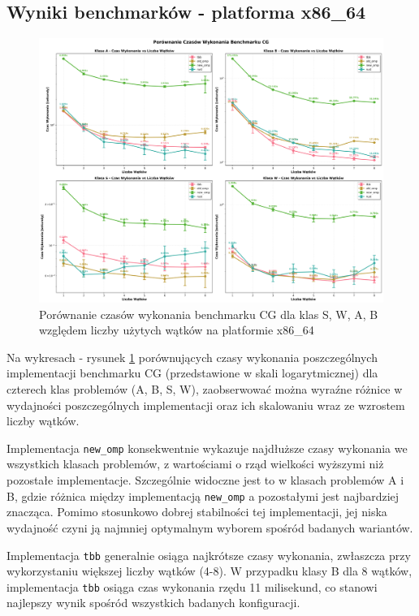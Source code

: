 \subsection{Wyniki benchmarków - platforma x86\_64}
\begin{figure}[H]
    \centering
    \includegraphics[width=\textwidth]{analiza/images/parallel/cg/x86/cg_porownanie_czasow_wykonania.png}
    \caption{Porównanie czasów wykonania benchmarku CG dla klas S, W, A, B względem liczby użytych wątków na platformie x86\_64}
    \label{cg_porownanie_czasow_wykonania_x86_64}
\end{figure}
Na wykresach - rysunek \ref{cg_porownanie_czasow_wykonania_x86_64} porównujących czasy wykonania poszczególnych implementacji benchmarku CG (przedstawione w skali logarytmicznej) dla czterech klas problemów (A, B, S, W), zaobserwować można wyraźne różnice w wydajności poszczególnych implementacji oraz ich skalowaniu wraz ze wzrostem liczby wątków.

Implementacja \texttt{new\_omp} konsekwentnie wykazuje najdłuższe czasy wykonania we wszystkich klasach problemów, z wartościami o rząd wielkości wyższymi niż pozostałe implementacje. Szczególnie widoczne jest to w klasach problemów A i B, gdzie różnica między implementacją \texttt{new\_omp} a pozostałymi jest najbardziej znacząca. Pomimo stosunkowo dobrej stabilności tej implementacji, jej niska wydajność czyni ją najmniej optymalnym wyborem spośród badanych wariantów.

Implementacja \texttt{tbb} generalnie osiąga najkrótsze czasy wykonania, zwłaszcza przy wykorzystaniu większej liczby wątków (4-8). W przypadku klasy B dla 8 wątków, implementacja \texttt{tbb} osiąga czas wykonania rzędu 11 milisekund, co stanowi najlepszy wynik spośród wszystkich badanych konfiguracji.

